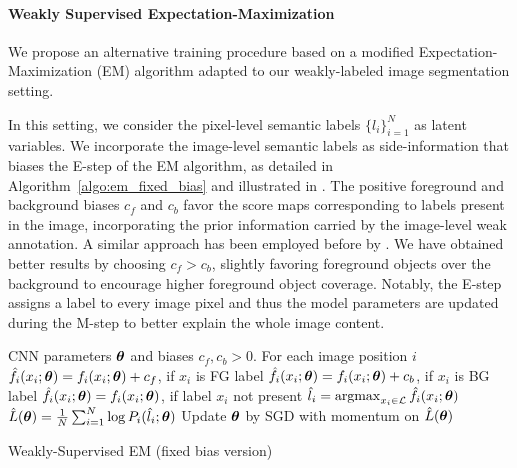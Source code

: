 \paragraph{Weakly Supervised Expectation-Maximization}

We propose an alternative training procedure based on a modified
Expectation-Maximization (EM) algorithm adapted to our weakly-labeled
image segmentation setting.

In this setting, we consider the pixel-level semantic labels
$\{l_i\}_{i=1}^N$ as latent variables. We incorporate the image-level
semantic labels as side-information that biases the E-step of the EM
algorithm, as detailed in Algorithm~\ref{algo:em_fixed_bias} and
illustrated in . The positive
foreground and background biases $c_f$ and $c_b$ favor the score maps
corresponding to labels present in the image, incorporating the prior
information carried by the image-level weak annotation. A similar
approach has been employed before by \citet{Lu2013sports}. We have
obtained better results by choosing $c_f > c_b$, slightly favoring
foreground objects over the background to encourage higher foreground
object coverage. Notably, the E-step assigns a label to every image
pixel and thus the model parameters are updated during the M-step to
better explain the whole image content.

\begin{algorithm}[!htbp]
  \centering
  \begin{algorithmic}[1]
    \algrenewcommand{}
    \Require CNN parameters $\boldsymbol{\theta}$ and biases $c_f, c_b > 0$.
    \algrenewcommand{}
    \Require For each image position $i$
    \State $\hat{f}_i (x_i; \boldsymbol{\theta}) = f_i(x_i; \boldsymbol{\theta}) + c_f$, if $x_i$ is FG label 
    \State $\hat{f}_i (x_i; \boldsymbol{\theta}) = f_i(x_i; \boldsymbol{\theta}) + c_b$, if $x_i$ is BG label 
    \State $\hat{f}_i (x_i; \boldsymbol{\theta}) = f_i(x_i; \boldsymbol{\theta})$, if label $x_i$ not present
    \State $\hat{l}_i = \mathop{\mathrm{argmax}}_{x_i \in \mathcal{L}} \hat{f}_i (x_i; \boldsymbol{\theta})$ 
    \algrenewcommand{}
    \Require
    \State $\hat{L}(\boldsymbol{\theta}) = \frac{1}{N} \sum_{i = 1}^N \log P_i(\hat{l}_i; \boldsymbol{\theta})$ 
    \State Update $\boldsymbol{\theta}$ by SGD with momentum on $\hat{L}(\boldsymbol{\theta})$
    \end{algorithmic}
  \caption{Weakly-Supervised EM (fixed bias version)}
  \label{algo:em_fixed_bias}
\end{algorithm}

